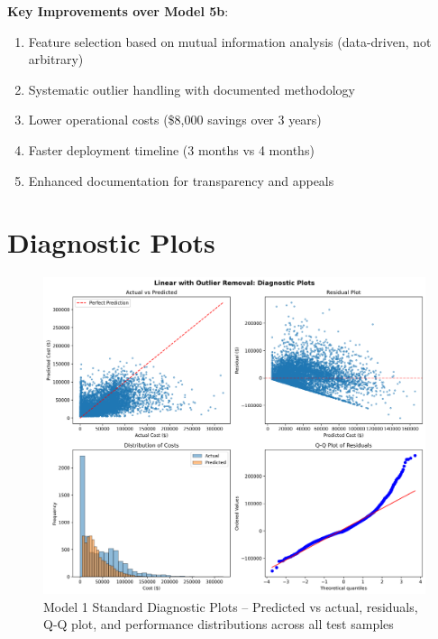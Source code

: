 \textbf{Key Improvements over Model 5b}:
\begin{enumerate}
    \item Feature selection based on mutual information analysis (data-driven, not arbitrary)
    \item Systematic outlier handling with documented methodology
    \item Lower operational costs (\$8,000 savings over 3 years)
    \item Faster deployment timeline (3 months vs 4 months)
    \item Enhanced documentation for transparency and appeals
\end{enumerate}

\section{Diagnostic Plots}

\begin{figure}[h!]
\centering
\includegraphics[width=\textwidth]{models/model_1/diagnostic_plots.png}
\caption{Model 1 Standard Diagnostic Plots -- Predicted vs actual, residuals, Q-Q plot, and performance distributions across all test samples}
\label{fig:model1_diagnostics}
\end{figure}

